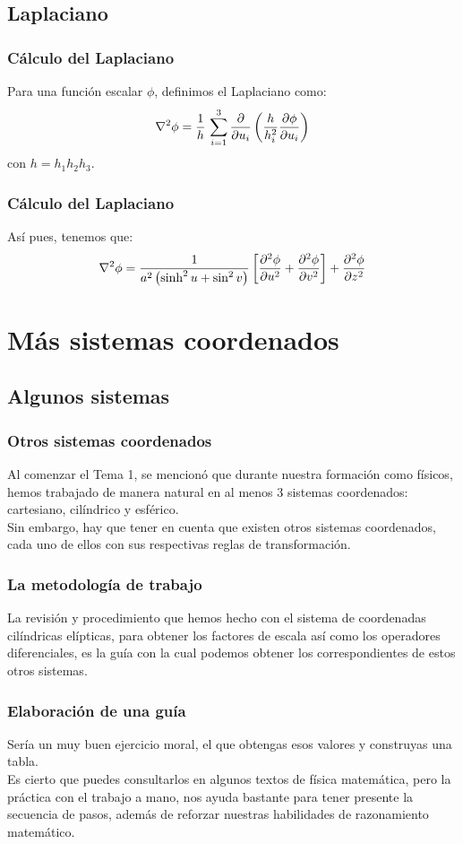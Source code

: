 \documentclass[12pt]{beamer}
\begin{document}
\subsection{Laplaciano}
\begin{frame}
\frametitle{Cálculo del Laplaciano}
Para una función escalar $\phi$, definimos el Laplaciano como:
\begin{align*}
\laplacian{\phi} = \dfrac{1}{h} \, \sum_{i=1}^{3} \pdv{u_{i}} \left( \dfrac{h}{h_{i}^{2}}  \pdv{\phi}{u_{i}} \right)
\end{align*}
con $h = h_{1} h_{2} h_{3}$.
\end{frame}
\begin{frame}
\frametitle{Cálculo del Laplaciano}
Así pues, tenemos que:
\begin{align*}
\laplacian{\phi} = \dfrac{1}{a^{2} \left( \sinh^{2} u + \sin^{2} v \right)} \left[ \pdv[2]{\phi}{u} + \pdv[2]{\phi}{v} \right] + \pdv[2]{\phi}{z}
\end{align*}
\end{frame}

\section{Más sistemas coordenados}
\subsection{Algunos sistemas}

\begin{frame}
\frametitle{Otros sistemas coordenados}
Al comenzar el Tema 1, se mencionó que durante nuestra formación como físicos, hemos trabajado de manera natural en al menos $3$ sistemas coordenados: cartesiano, cilíndrico y esférico.
\\
\bigskip
\pause
Sin embargo, hay que tener en cuenta que existen otros sistemas coordenados, cada uno de ellos con sus respectivas reglas de transformación.
\end{frame}
\begin{frame}
\frametitle{La metodología de trabajo}
La revisión y procedimiento que hemos hecho con el sistema de coordenadas cilíndricas elípticas, para obtener los factores de escala así como los operadores diferenciales, es la guía con la cual podemos obtener los correspondientes de estos otros sistemas.
\end{frame}
\begin{frame}
\frametitle{Elaboración de una guía}
Sería un muy buen ejercicio moral, el que obtengas esos valores y construyas una tabla.
\\
\bigskip
\pause
Es cierto que puedes consultarlos en algunos textos de física matemática, pero la práctica con el trabajo a mano, nos ayuda bastante para tener presente la secuencia de pasos, además de reforzar nuestras habilidades de razonamiento matemático.
\end{frame}
\end{document}
